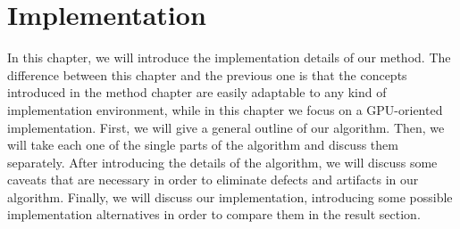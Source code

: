 

	

\chapter{Implementation}

In this chapter, we will introduce the implementation details of our method. The difference between this chapter and the previous one is that the concepts introduced in the method chapter are easily adaptable to any kind of implementation environment, while in this chapter we focus on a GPU-oriented implementation. First, we will give a general outline of our algorithm. Then, we will take each one of the single parts of the algorithm and discuss them separately. After introducing the details of the algorithm, we will discuss some caveats that are necessary in order to eliminate defects and artifacts in our algorithm. Finally, we will discuss our implementation, introducing some possible implementation alternatives in order to compare them in the result section.

